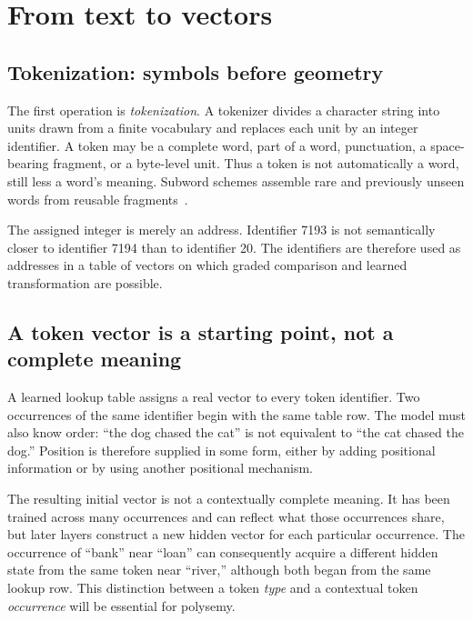 \documentclass[
  aps,
  reprint,
  superscriptaddress,
  floatfix,
  nofootinbib,
  longbibliography
]{revtex4-2}
\begin{document}
\section{From text to vectors}
\label{sec:vectors}

\subsection{Tokenization: symbols before geometry}

The first operation is \emph{tokenization}.  A tokenizer divides a character
string into units drawn from a finite vocabulary and replaces each unit by an
integer identifier.  A token may be a complete word, part of a word,
punctuation, a space-bearing fragment, or a byte-level unit.  Thus a token is
not automatically a word, still less a word's meaning.  Subword schemes
assemble rare and previously unseen words from reusable
fragments~\cite{sennrich2016subword}.

The assigned integer is merely an address.  Identifier 7193 is not
semantically closer to identifier 7194 than to identifier 20.  The identifiers
are therefore used as addresses in a table of vectors on which graded
comparison and learned transformation are possible.

\subsection{A token vector is a starting point, not a complete meaning}

A learned lookup table assigns a real vector to every token identifier.  Two
occurrences of the same identifier begin with the same table row.  The model
must also know order: ``the dog chased the cat'' is not equivalent to ``the
cat chased the dog.''  Position is therefore supplied in some form, either by
adding positional information or by using another positional mechanism.

The resulting initial vector is not a contextually complete meaning.  It has
been trained across many occurrences and can reflect what those occurrences
share, but later layers construct a new hidden vector for each particular
occurrence.  The occurrence of ``bank'' near ``loan'' can consequently acquire
a different hidden state from the same token near ``river,'' although both
began from the same lookup row.  This distinction between a token \emph{type}
and a contextual token \emph{occurrence} will be essential for polysemy.
\end{document}
